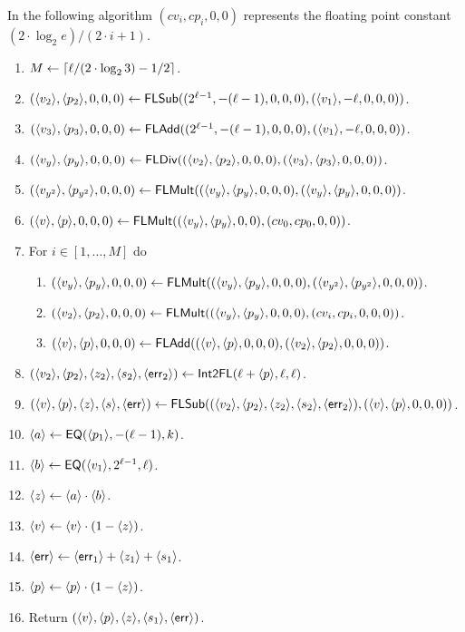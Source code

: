   In the following algorithm $(cv_i,cp_i,0,0)$ represents the floating point
  constant $(2 \cdot \log_2 e)/(2 \cdot i+1)$.
  \begin{enumerate}
    \item $M \leftarrow {\lceil  \ell/(2 \cdot \log_2 3)-1/2 \rceil}$.
    \item $(\langle v_2 \rangle,\langle p_2 \rangle,0,0,0) \leftarrow \mathsf{FLSub}((2^{\ell-1},-(\ell-1),0,0,0),(\langle v_1 \rangle,-\ell,0,0,0))$.
    \item $(\langle v_3 \rangle,\langle p_3 \rangle,0,0,0) \leftarrow \mathsf{FLAdd}((2^{\ell-1},-(\ell-1),0,0,0),(\langle v_1 \rangle,-\ell,0,0,0))$.
    \item $(\langle v_y \rangle,\langle p_y \rangle,0,0,0) \leftarrow \mathsf{FLDiv}((\langle v_2 \rangle,\langle p_2 \rangle,0,0,0),(\langle v_3 \rangle,\langle p_3 \rangle,0,0,0))$.
    \item $(\langle v_{y^2} \rangle,\langle p_{y^2} \rangle,0,0,0) \leftarrow \mathsf{FLMult}((\langle v_y \rangle,\langle p_y \rangle,0,0,0),(\langle v_y \rangle,\langle p_y \rangle,0,0,0))$.
    \item $(\langle v \rangle,\langle p \rangle,0,0,0) \leftarrow  \mathsf{FLMult}((\langle v_y \rangle,\langle p_y \rangle,0,0),(cv_0,cp_0,0,0))$.
    \item For $i \in[1,\ldots,M]$ do
          \begin{enumerate}
            \item $(\langle v_y \rangle,\langle p_y \rangle,0,0,0) \leftarrow \mathsf{FLMult}((\langle v_y \rangle,\langle p_y \rangle,0,0,0),(\langle v_{y^2} \rangle,\langle p_{y^2} \rangle,0,0,0))$.
            \item $(\langle v_2 \rangle,\langle p_2 \rangle,0,0,0) \leftarrow \mathsf{FLMult}((\langle v_y \rangle,\langle p_y \rangle,0,0,0),(cv_i,cp_i,0,0,0))$.
            \item $(\langle v \rangle,\langle p \rangle,0,0,0) \leftarrow \mathsf{FLAdd}((\langle v \rangle,\langle p \rangle,0,0,0),(\langle v_2 \rangle,\langle p_2 \rangle,0,0,0))$.
          \end{enumerate}
  \item $(\langle v_2 \rangle,\langle p_2 \rangle,\langle z_2 \rangle,\langle s_2 \rangle,\langle \mathsf{err}_2 \rangle) \leftarrow \mathsf{Int2FL}(\ell+\langle p \rangle,\ell,\ell)$. %
    \item $(\langle v \rangle,\langle p \rangle,\langle z \rangle,\langle s \rangle,\langle \mathsf{err} \rangle) \leftarrow \mathsf{FLSub}((\langle v_2 \rangle,\langle p_2 \rangle,\langle z_2 \rangle,\langle s_2 \rangle,\langle \mathsf{err}_2 \rangle),(\langle v \rangle,\langle p \rangle,0,0,0))$.
    \item $\langle a \rangle \leftarrow \mathsf{EQ}(\langle p_1 \rangle,-(\ell-1),k)$.
    \item $\langle b \rangle \leftarrow \mathsf{EQ}(\langle v_1 \rangle,2^{\ell-1},\ell)$.
    \item $\langle z \rangle \leftarrow \langle a \rangle \cdot \langle b \rangle$.
    \item $\langle v \rangle \leftarrow \langle v \rangle \cdot(1-\langle z \rangle)$.
    \item $\langle \mathsf{err} \rangle \leftarrow \langle \mathsf{err}_1 \rangle + \langle z_1 \rangle + \langle s_1 \rangle$.
    \item $\langle p \rangle \leftarrow \langle p \rangle \cdot(1-\langle z \rangle)$.
    \item Return $(\langle v \rangle,\langle p \rangle,\langle z \rangle,\langle s_1 \rangle,\langle \mathsf{err} \rangle)$.
  \end{enumerate}


